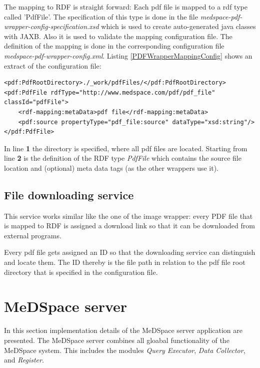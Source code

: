 The mapping to RDF is straight forward: Each pdf file is mapped to a rdf type called 'PdfFile'. The specification of this type is done in the file \emph{medspace-pdf-wrapper-config-specification.xsd} which is used to create auto-generated java classes with JAXB. Also it is used to validate the mapping configuration file. The definition of the mapping is done in the corresponding configuration file \emph{medspace-pdf-wrapper-config.xml}. Listing \ref{PDFWrapperMappingConfig} shows an extract of the configuration file:

\begin{lstlisting}[style=RdfCodeStyle, caption=Extract of the pdf wrapper configuration, label=PDFWrapperMappingConfig]
<pdf:PdfRootDirectory>./_work/pdfFiles/</pdf:PdfRootDirectory>
<pdf:PdfFile rdfType="http://www.medspace.com/pdf/pdf_file" classId="pdfFile">
	<rdf-mapping:metaData>pdf file</rdf-mapping:metaData>
    <pdf:source propertyType="pdf_file:source" dataType="xsd:string"/>
</pdf:PdfFile>
\end{lstlisting}

In line \textbf{1} the directory is specified, where all pdf files are located.
Starting from line \textbf{2} is the definition of the RDF type \emph{PdfFile} which contains the source file location and (optional) meta data tags (as the other wrappers use it).

\subsection{File downloading service}

This service works similar like the one of the image wrapper: every PDF file that is mapped to RDF is assigned a download link so that it can be downloaded from external programs.

Every pdf file gets assigned an ID so that the downloading service can distinguish and locate them. The ID thereby is the file path in relation to the pdf file root directory that is specified in the configuration file.

\section{MeDSpace server}

In this section implementation details of the MeDSpace server application are presented. The MeDSpace server combines all gloabal functionality of the MeDSpace system. This includes the modules \emph{Query Executor}, \emph{Data Collector}, and \emph{Register}.

